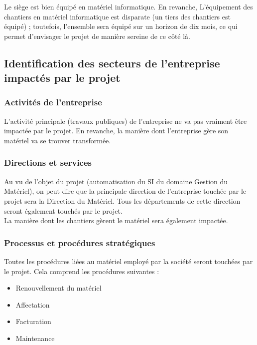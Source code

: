 \documentclass[12pt]{article}
\begin{document}
Le siège est bien équipé en matériel informatique. En revanche, 
L'équipement des chantiers en matériel informatique est disparate (un tiers
des chantiers est équipé) ; toutefois, l'ensemble sera équipé sur un horizon de
dix mois, ce qui permet d'envisager le projet de manière sereine de ce côté
là.


\subsection{Identification des secteurs de l'entreprise impactés par le projet}

\subsubsection{Activités de l'entreprise}

L'activité principale (travaux publiques) de l'entreprise ne va pas
vraiment être impactée par le projet. En revanche, la manière dont
l'entreprise gère son matériel va se trouver transformée.


\subsubsection{Directions et services}

Au vu de l'objet du projet (automatisation du SI du domaine Gestion du
Matériel), on peut dire que la principale direction de l'entreprise touchée
par le projet sera la Direction du Matériel. Tous les départements de cette
direction seront également touchés par le projet.\\
La manière dont les chantiers gèrent le matériel sera également impactée.


\subsubsection{Processus et procédures stratégiques}

Toutes les procédures liées au matériel employé par la société seront
touchées par le projet. Cela comprend les procédures suivantes :
\begin{itemize}
\item Renouvellement du matériel
\item Affectation
\item Facturation
\item Maintenance
\end{itemize}
\end{document}
